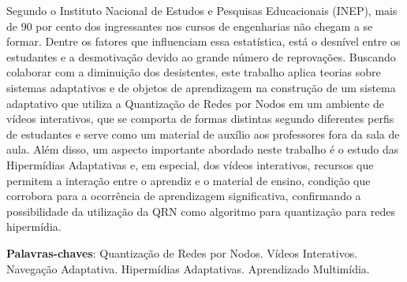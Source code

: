 \begin{resumo}
Segundo o Instituto Nacional de Estudos e Pesquisas Educacionais (INEP), mais de 90 por cento dos ingressantes nos cursos de engenharias não chegam a se formar. Dentre os fatores que influenciam essa estatística, está o desnível entre os estudantes e a desmotivação devido ao grande número de reprovações. Buscando colaborar com a diminuição dos desistentes, este trabalho aplica teorias sobre sistemas adaptativos e de objetos de aprendizagem na construção de um sistema adaptativo que utiliza a Quantização de Redes por Nodos em um ambiente de vídeos interativos, que se comporta de formas distintas segundo diferentes perfis de estudantes e serve como um material de auxílio aos professores fora da sala de aula. Além disso, um aspecto importante abordado neste trabalho é o estudo das Hipermídias Adaptativas e, em especial, dos vídeos interativos, recursos que permitem a interação entre o aprendiz e o material de ensino, condição que corrobora para a ocorrência de aprendizagem significativa, confirmando a possibilidade da utilização da QRN como algoritmo para quantização para redes hipermídia.

 \vspace{\onelineskip}
    
 \noindent
 \textbf{Palavras-chaves}: Quantização de Redes por Nodos. Vídeos Interativos. Navegação Adaptativa. Hipermídias Adaptativas. Aprendizado Multimídia.
\end{resumo}
